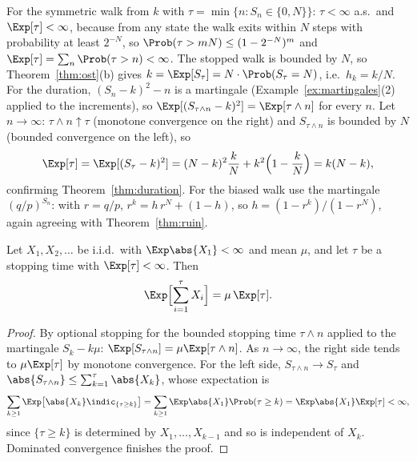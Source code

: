 \begin{example}\label{ex:ruinmart}
For the symmetric walk from $k$ with $\tau=\min\{n:S_n\in\{0,N\}\}$:
$\tau<\infty$ a.s.\ and $\Exp[\tau]<\infty$, because from any state the walk exits within
$N$ steps with probability at least $2^{-N}$, so $\Prob(\tau>mN)\le(1-2^{-N})^m$ and
$\Exp[\tau]=\sum_n\Prob(\tau>n)<\infty$. The stopped walk is bounded by $N$, so
Theorem~\ref{thm:ost}(b) gives $k=\Exp[S_\tau]=N\cdot\Prob(S_\tau=N)$, i.e.\ $h_k=k/N$. For the
duration, $(S_n-k)^2-n$ is a martingale (Example~\ref{ex:martingales}(2) applied to the
increments), so $\Exp[(S_{\tau\wedge n}-k)^2]=\Exp[\tau\wedge n]$ for every $n$. Let
$n\to\infty$: $\tau\wedge n\uparrow\tau$ (monotone convergence on the right) and
$S_{\tau\wedge n}$ is bounded by $N$ (bounded convergence on the left), so
\[
\Exp[\tau]=\Exp[(S_\tau-k)^2]=(N-k)^2\frac kN+k^2\Bigl(1-\frac kN\Bigr)=k(N-k),
\]
confirming Theorem~\ref{thm:duration}. For the biased walk use the martingale
$(q/p)^{S_n}$: with $r=q/p$, $r^k=h\,r^N+(1-h)$, so $h=(1-r^k)/(1-r^N)$, again agreeing with
Theorem~\ref{thm:ruin}.
\end{example}

\begin{theorem}\label{thm:wald}
Let $X_1,X_2,\dots$ be i.i.d.\ with $\Exp\abs{X_1}<\infty$ and mean $\mu$, and let $\tau$ be a
stopping time with $\Exp[\tau]<\infty$. Then
\[
\Exp\Bigl[\sum_{i=1}^\tau X_i\Bigr]=\mu\,\Exp[\tau].
\]
\end{theorem}
\begin{proof}
By optional stopping for the bounded stopping time $\tau\wedge n$ applied to the martingale
$S_k-k\mu$: $\Exp[S_{\tau\wedge n}]=\mu\Exp[\tau\wedge n]$. As $n\to\infty$, the right side
tends to $\mu\Exp[\tau]$ by monotone convergence. For the left side, $S_{\tau\wedge n}\to S_\tau$
and $\abs{S_{\tau\wedge n}}\le\sum_{k=1}^\tau\abs{X_k}$, whose expectation is
\[
\sum_{k\ge1}\Exp\bigl[\abs{X_k}\indic_{\{\tau\ge k\}}\bigr]=\sum_{k\ge1}\Exp\abs{X_1}\Prob(\tau\ge k)
=\Exp\abs{X_1}\Exp[\tau]<\infty,
\]
since $\{\tau\ge k\}$ is determined by $X_1,\dots,X_{k-1}$ and so is independent of $X_k$.
Dominated convergence finishes the proof.
\end{proof}

